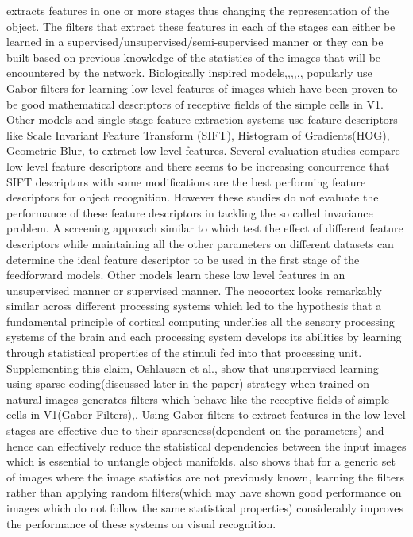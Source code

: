\documentclass[12pt,twoside]{article}
\theoremstyle{plain}
\theoremstyle{definition}
\theoremstyle{remark}
\begin{document}
extracts features in one or more stages thus changing the representation of the object. The filters that extract these features in each of the stages can either be learned in a supervised/unsupervised/semi-supervised manner or they can be built based on previous knowledge of the statistics of the images that will be encountered by the network. Biologically inspired models\cite{Fukushim1980},\cite{JimMutch2008},\cite{MaximilianRiesenhuber1999},\cite{NicolasPinto2008},\cite{ThomasSerre2007},\cite{MarkusLessmann2014},\cite{XiaolinHu2014} popularly use Gabor filters\cite{Gabor1946} for learning low level features of images which have been proven to be good mathematical descriptors of receptive fields of the simple cells in V1\cite{JPJones1987}. Other models\cite{K.Kavukcuoglu2009} and single stage feature extraction systems use feature descriptors like Scale Invariant Feature Transform (SIFT)\cite{Lowe2004}, Histogram of Gradients(HOG), Geometric Blur\cite{BergA.C2001},\cite{HaoZhang2006} \cite{NavneetDalal2005} to extract low level features. Several evaluation studies\cite{Mikolajczyk2005} compare low level feature descriptors and there seems to be increasing concurrence that SIFT\cite{Lowe2004} descriptors with some modifications are the best performing feature descriptors for object recognition. However these studies do not evaluate\cite{NicolasPinto2011} the performance of these feature descriptors in tackling the so called invariance problem\cite{NicolasPinto2008}. A screening approach similar to \cite{NicolasPinto2009} which test the effect of different feature descriptors while maintaining all the other parameters on different datasets can determine the ideal feature descriptor to be used in the first stage of the feedforward models. Other models\cite{K.Kavukcuoglu2009} learn these low level features in an unsupervised manner or supervised manner. The neocortex looks remarkably similar across different processing systems which led to the hypothesis that a fundamental principle of cortical computing underlies all the sensory processing systems\cite{VB1997} of the brain and each processing system develops its abilities by learning through statistical properties of the stimuli fed into that processing unit. Supplementing this claim, Oshlausen et al.,\cite{BrunoA.Olshausen1996} show that unsupervised learning using sparse coding(discussed later in the paper) strategy when trained on natural images generates filters which behave like the receptive fields of simple cells in V1(Gabor Filters)\cite{JPJones1987},\cite{Gabor1946}. Using Gabor filters to extract  features in the low level stages are effective due to their sparseness(dependent on the parameters) and hence can effectively reduce the statistical dependencies\cite{BrunoA.Olshausen1996} between the input images which is essential to untangle object manifolds\cite{JamesJ.DiCarlo2007}. \cite{KevinJarret2009} also shows that for a generic set of images where the image statistics are not previously known, learning the filters rather than applying random filters(which may have shown good performance on images which do not follow the same statistical properties) considerably improves the performance of these systems on visual recognition. 
\end{document}
